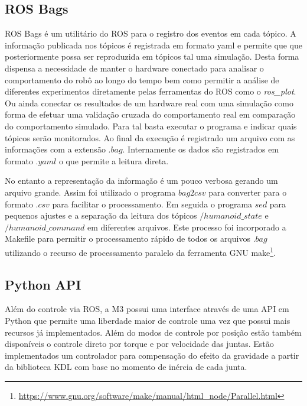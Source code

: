 \subsection{ROS Bags}

ROS Bags é um utilitário do ROS para o registro dos eventos em cada tópico. A informação publicada nos tópicos é registrada em formato yaml e permite que que posteriormente possa ser reproduzida em tópicos tal uma simulação. Desta forma dispensa a necessidade de manter o hardware conectado para analisar o comportamento do robô ao longo do tempo bem como permitir a análise de diferentes experimentos diretamente pelas ferramentas do ROS como o \textit{ros\_plot}. Ou ainda conectar os resultados de um hardware real com uma simulação como forma de efetuar uma validação cruzada do comportamento real em comparação do comportamento simulado. Para tal basta executar o programa e indicar quais tópicos serão monitorados. Ao final da execução é registrado um arquivo com as informações com a extensão $.bag$. Internamente os dados são registrados em formato $.yaml$ o que permite a leitura direta.

No entanto a representação da informação é um pouco verbosa gerando um arquivo grande. Assim foi utilizado o programa $bag2csv$ para converter para o formato $.csv$ para facilitar o processamento. Em seguida o programa $sed$ para pequenos ajustes e a separação da leitura dos tópicos  $/humanoid\_state$ e $/humanoid\_command$ em diferentes arquivos. Este processo foi incorporado a Makefile para permitir o processamento rápido de todos os arquivos $.bag$ utilizando o recurso de processamento paralelo da ferramenta GNU make\footnote{\url{https://www.gnu.org/software/make/manual/html_node/Parallel.html}}.

\subsection{Python API}

Além do controle via ROS, a M3 possui uma interface através de uma API em Python que permite uma liberdade maior de controle uma vez que possui mais recursos já implementados. Além do modos de controle por posição estão também disponíveis o controle direto por torque e por velocidade das juntas. Estão implementados um controlador para compensação do efeito da gravidade a partir da biblioteca KDL com base no momento de inércia de cada junta.

